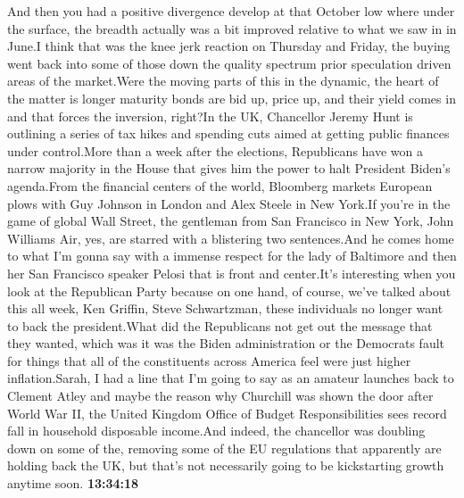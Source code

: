 \documentclass{article}%
\begin{document}
And then you had a positive divergence develop at that October low where under the surface, the breadth actually was a bit improved relative to what we saw in in June.I think that was the knee jerk reaction on Thursday and Friday, the buying went back into some of those down the quality spectrum prior speculation driven areas of the market.Were the moving parts of this in the dynamic, the heart of the matter is longer maturity bonds are bid up, price up, and their yield comes in and that forces the inversion, right?In the UK, Chancellor Jeremy Hunt is outlining a series of tax hikes and spending cuts aimed at getting public finances under control.More than a week after the elections, Republicans have won a narrow majority in the House that gives him the power to halt President Biden's agenda.From the financial centers of the world, Bloomberg markets European plows with Guy Johnson in London and Alex Steele in New York.If you're in the game of global Wall Street, the gentleman from San Francisco in New York, John Williams Air, yes, are starred with a blistering two sentences.And he comes home to what I'm gonna say with a immense respect for the lady of Baltimore and then her San Francisco speaker Pelosi that is front and center.It's interesting when you look at the Republican Party because on one hand, of course, we've talked about this all week, Ken Griffin, Steve Schwartzman, these individuals no longer want to back the president.What did the Republicans not get out the message that they wanted, which was it was the Biden administration or the Democrats fault for things that all of the constituents across America feel were just higher inflation.Sarah, I had a line that I'm going to say as an amateur launches back to Clement Atley and maybe the reason why Churchill was shown the door after World War II, the United Kingdom Office of Budget Responsibilities sees record fall in household disposable income.And indeed, the chancellor was doubling down on some of the, removing some of the EU regulations that apparently are holding back the UK, but that's not necessarily going to be kickstarting growth anytime soon.%
\textbf{13:34:18}%
\newline%
\end{document}
